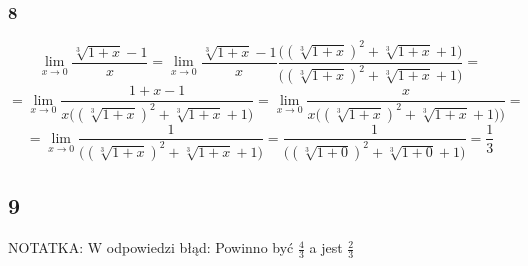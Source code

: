 \documentclass{article}
\begin{document}
\subsubsection*{8}

\begin{equation*}
    \lim_{x \to 0} \frac{\sqrt[3]{1+ x} - 1}{x} = \lim_{x \to 0} \frac{\sqrt[3]{1+ x} - 1}{x} \frac{\Bigg((\sqrt[3]{1+ x})^2 + \sqrt[3]{1+ x} + 1\Bigg)}{\Bigg((\sqrt[3]{1+ x})^2 + \sqrt[3]{1+ x} + 1\Bigg)} = 
\end{equation*}
\begin{equation*}
    = \lim_{x \to 0} \frac{1 + x - 1}{x \Big((\sqrt[3]{1+ x})^2 + \sqrt[3]{1+ x} + 1\Big)} = \lim_{x \to 0} \frac{x}{x \Big( (\sqrt[3]{1+ x})^2 + \sqrt[3]{1+ x} + 1)\Big)} =
\end{equation*}
\begin{equation*}
    = \lim_{x \to 0} \frac{1}{\Big( (\sqrt[3]{1+ x})^2 + \sqrt[3]{1+ x} + 1\Big)} = \frac{1}{\Big( (\sqrt[3]{1+ 0})^2 + \sqrt[3]{1+ 0} + 1\Big)} = \frac{1}{3}
\end{equation*}


\subsection*{9}

\begin{center}
    NOTATKA: W odpowiedzi błąd: Powinno być \(\frac{4}{3}\) a jest \(\frac{2}{3}\)
\end{center}
\end{document}
